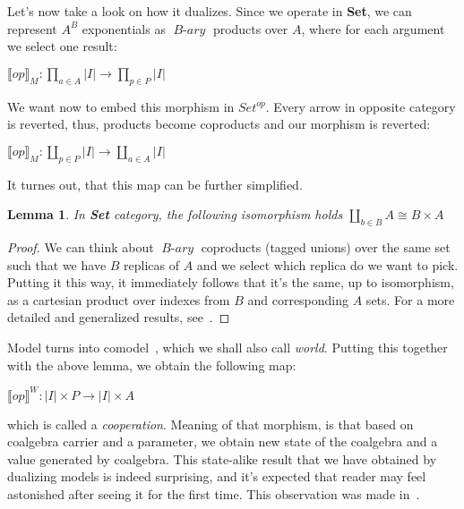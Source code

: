 \documentclass[declaration,shortabstract]{iithesis}
\theoremstyle{definition} \newtheorem{definition}{Definition}[chapter]
\theoremstyle{remark} \newtheorem{remark}[definition]{Observation}
\theoremstyle{plain} \newtheorem{theorem}[definition]{Theorem}
\theoremstyle{plain} \newtheorem{lemma}[definition]{Lemma}
\newcommand{\mathVar}[1]{{\operatorname{\mathit{#1}}}}
\begin{document}
    Let's now take a look on how it dualizes. Since we operate in \textbf{Set},
    we can represent $A^{B}$ exponentials as $\mathVar{B-ary}$ products over $A$,
    where for each argument we select one result:

    \begin{center}
        {$\displaystyle {\llbracket op \rrbracket}_M : \prod_{a \in A}{|I|} \rightarrow \prod_{p \in P}{|I|} $}
    \end{center}

    \noindent
    We want now to embed this morphism in $Set^{op}$. Every arrow in opposite
    category is reverted, thus, products become coproducts and our morphism
    is reverted:

    \begin{center}
        {$\displaystyle {\llbracket op \rrbracket}_M : \coprod_{p \in P}{|I|} \rightarrow \coprod_{a \in A}{|I|} $}
    \end{center}

    \noindent
    It turnes out, that this map can be further simplified.

    \begin{lemma}
        In \textbf{Set} category, the following isomorphism holds
        {$\displaystyle \coprod_{b \in B}{A} \cong B \times A $}
    \end{lemma}
    \begin{proof}
        We can think about $\mathVar{B-ary}$ coproducts (tagged unions) over the same set
        such that we have $B$ replicas of $A$ and we select which replica do we want
        to pick. Putting it this way, it immediately follows that it's the same,
        up to isomorphism, as a cartesian product over indexes from $B$ and
        corresponding $A$ sets. For a more detailed and generalized results,
        see~\cite{tensors}.
    \end{proof}

    Model turns into comodel~\cite{comodels}, which we shall also call \textit{world}.
    Putting this together with the above lemma, we obtain the following map:

    \begin{center}
        $ {\llbracket op \rrbracket}^W : {|I|} \times {P} \rightarrow  {|I|} \times {A} $
    \end{center}

    \noindent
    which is called a \textit{cooperation}. Meaning of that morphism, is that
    based on coalgebra carrier and a parameter, we obtain new state of the
    coalgebra and a value generated by coalgebra. This state-alike result that
    we have obtained by dualizing models is indeed surprising, and it's
    expected that reader may feel astonished after seeing it for the first time.
    This observation was made in~\cite{tensors}.
\end{document}
